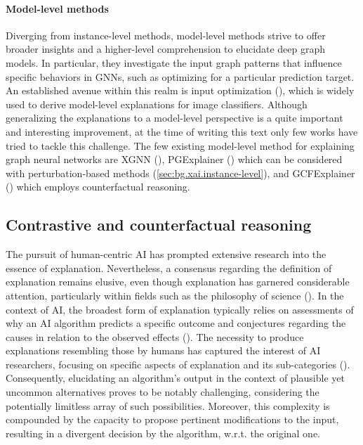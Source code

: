 \documentclass[binding=0.6cm]{sapthesis}
\newcommand{\mycite}[1]{(\cite{#1})}
\begin{document}
\paragraph{Model-level methods}
\label{sec:bg.xai.model-level}
Diverging from instance-level methods, model-level methods strive to offer broader insights and a higher-level comprehension to elucidate deep graph models. In particular, they investigate the input graph patterns that influence specific behaviors in GNNs, such as optimizing for a particular prediction target. An established avenue within this realm is input optimization \mycite{olah2017-feat-viz}, which is widely used to derive model-level explanations for image classifiers. Although generalizing the explanations to a model-level perspective is a quite important and interesting improvement, at the time of writing this text only few works have tried to tackle this challenge. The few existing model-level method for explaining graph neural networks are XGNN \mycite{yuan2020-xgnn}, PGExplainer \mycite{luo2020-pgexplainer} which can be considered with perturbation-based methods (\cref{sec:bg.xai.instance-level}), and GCFExplainer \mycite{huang2023-globalCF} which employs counterfactual reasoning.

\subsection{Contrastive and counterfactual reasoning}
\label{sec:bg.xai.cf-reason}
The pursuit of human-centric AI has prompted extensive research into the essence of explanation. Nevertheless, a consensus regarding the definition of explanation remains elusive, even though explanation has garnered considerable attention, particularly within fields such as the philosophy of science \mycite{schurz2000-scientific-expl,pitt1989-theories-of-E}. In the context of AI, the broadest form of explanation typically relies on assessments of why an AI algorithm predicts a specific outcome and conjectures regarding the causes in relation to the observed effects \mycite{lombrozo2012-abductive-inferemce}. The necessity to produce explanations resembling those  by humans has captured the interest of AI researchers, focusing on specific aspects of explanation and its sub-categories \mycite{miller2019-xai-insights}. Consequently, elucidating an algorithm's output in the context of plausible yet uncommon alternatives proves to be notably challenging, considering the potentially limitless array of such possibilities. Moreover, this complexity is compounded by the capacity to propose pertinent modifications to the input, resulting in a divergent decision by the algorithm, w.r.t. the original one.
\end{document}
